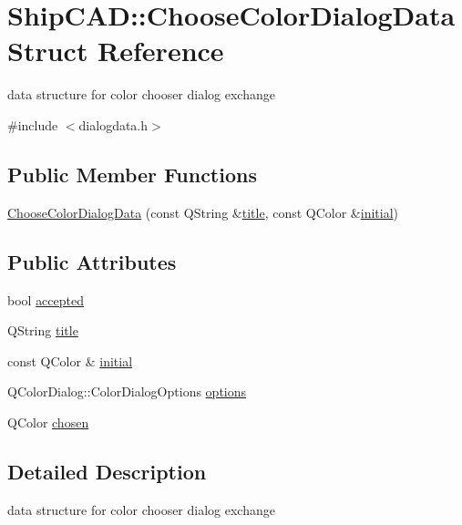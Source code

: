 \hypertarget{structShipCAD_1_1ChooseColorDialogData}{}\section{Ship\+C\+AD\+:\+:Choose\+Color\+Dialog\+Data Struct Reference}
\label{structShipCAD_1_1ChooseColorDialogData}


data structure for color chooser dialog exchange  




{\ttfamily \#include $<$dialogdata.\+h$>$}

\subsection*{Public Member Functions}
\begin{DoxyCompactItemize}
\item 
\hyperlink{structShipCAD_1_1ChooseColorDialogData_a5d0e08fd563445cda2b5d375dfbce127}{Choose\+Color\+Dialog\+Data} (const Q\+String \&\hyperlink{structShipCAD_1_1ChooseColorDialogData_aedfb5ee0ef99d57837d728a477303d0b}{title}, const Q\+Color \&\hyperlink{structShipCAD_1_1ChooseColorDialogData_a63bc2080dc3d30fe9a448df004410c8b}{initial})
\end{DoxyCompactItemize}
\subsection*{Public Attributes}
\begin{DoxyCompactItemize}
\item 
bool \hyperlink{structShipCAD_1_1ChooseColorDialogData_a5b600a941ccefec026e59e7d65caff63}{accepted}
\item 
Q\+String \hyperlink{structShipCAD_1_1ChooseColorDialogData_aedfb5ee0ef99d57837d728a477303d0b}{title}
\item 
const Q\+Color \& \hyperlink{structShipCAD_1_1ChooseColorDialogData_a63bc2080dc3d30fe9a448df004410c8b}{initial}
\item 
Q\+Color\+Dialog\+::\+Color\+Dialog\+Options \hyperlink{structShipCAD_1_1ChooseColorDialogData_ad0a90945a5a1942d892ca3a06dbd6545}{options}
\item 
Q\+Color \hyperlink{structShipCAD_1_1ChooseColorDialogData_afa2fd53ceaab239e68818cb93463e247}{chosen}
\end{DoxyCompactItemize}


\subsection{Detailed Description}
data structure for color chooser dialog exchange 

